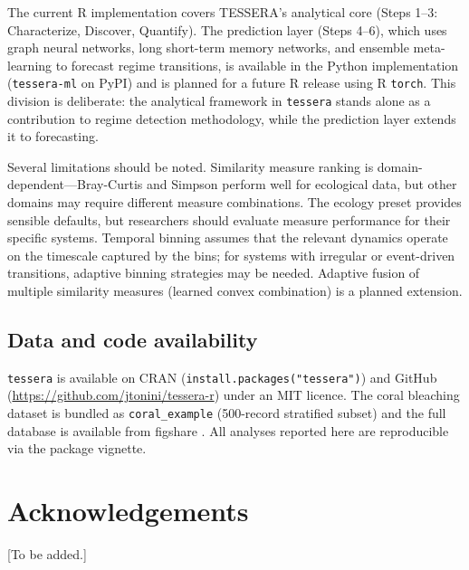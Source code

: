 \documentclass[12pt]{article}
\begin{document}
The current R implementation covers TESSERA's analytical core (Steps 1--3: Characterize, Discover, Quantify). The prediction layer (Steps 4--6), which uses graph neural networks, long short-term memory networks, and ensemble meta-learning to forecast regime transitions, is available in the Python implementation (\texttt{tessera-ml} on PyPI) and is planned for a future R release using R \texttt{torch}. This division is deliberate: the analytical framework in \texttt{tessera} stands alone as a contribution to regime detection methodology, while the prediction layer extends it to forecasting.

Several limitations should be noted. Similarity measure ranking is domain-dependent---Bray-Curtis and Simpson perform well for ecological data, but other domains may require different measure combinations. The ecology preset provides sensible defaults, but researchers should evaluate measure performance for their specific systems. Temporal binning assumes that the relevant dynamics operate on the timescale captured by the bins; for systems with irregular or event-driven transitions, adaptive binning strategies may be needed. Adaptive fusion of multiple similarity measures (learned convex combination) is a planned extension.

\subsection{Data and code availability}

\texttt{tessera} is available on CRAN (\texttt{install.packages("tessera")}) and GitHub (\url{https://github.com/jtonini/tessera-r}) under an MIT licence. The coral bleaching dataset is bundled as \texttt{coral\_example} (500-record stratified subset) and the full database is available from figshare \citep[doi:10.6084/m9.figshare.20078993;][]{vanWoesik2022}. All analyses reported here are reproducible via the package vignette.


\section*{Acknowledgements}

[To be added.]


\end{document}
